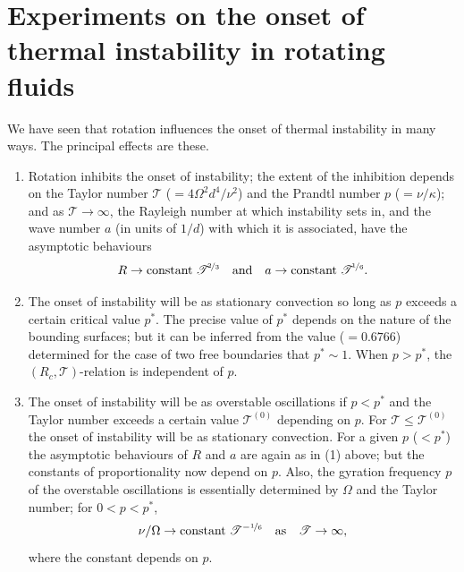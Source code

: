
\section{Experiments on the onset of thermal instability in rotating fluids}
\label{sec:35}

We have seen that rotation influences the onset of thermal instability
in many ways.  The principal effects are these.

\begin{enumerate}
\item[(1)] Rotation inhibits the onset of instability; the extent of the
  inhibition depends on the Taylor number $\mathscr{T}$ ($= 4\Omega^2 d^4/\nu^2$) and the
  Prandtl number $p$ ($= \nu/\kappa$); and as $\mathscr{T} \to \infty$, the Rayleigh number at which
  instability sets in, and the wave number $a$ (in units of $1/d$) with which it
  is associated, have the asymptotic behaviours
  \begin{equation}
    R \to \text{constant}\; \mathscr{T}^{\!\nicefrac{2}{3}}
    \quad \text{and} \quad
    a \to \text{constant}\; \mathscr{T}^{\!\nicefrac{1}{6}}.
    \label{eq:3-308}
  \end{equation}

\item[(2)] The onset of instability will be as stationary convection so long
  as $p$ exceeds a certain critical value $p^*$.  The precise value of $p^*$ depends
  on the nature of the bounding surfaces; but it can be inferred from the
  value ($= 0.6766$) determined for the case of two free boundaries that
  $p^* \sim 1$.  When $p > p^*$, the $(R_c, \mathscr{T})$-relation is independent of $p$.

\item[(3)] The onset of instability will be as overstable oscillations if $p < p^*$
  and the Taylor number exceeds a certain value $\mathscr{T}^{(0)}$ depending on $p$.  For
  $\mathscr{T} \leq \mathscr{T}^{(0)}$ the onset of instability will be as stationary convection.  For a
  given $p$ ($< p^*$) the asymptotic behaviours of $R$ and $a$ are again as in (1)
  above; but the constants of proportionality now depend on $p$.  Also, the
  gyration frequency $p$ of the overstable oscillations is essentially deter\-mined
  by $\Omega$ and the Taylor number; for $0 < p < p^*$,
  \begin{equation}
    \nu/\Omega \to \text{constant}\; \mathscr{T}^{-\nicefrac{1}{6}}
    \quad \text{as} \quad \mathscr{T} \to \infty,
    \label{eq:3-309}
  \end{equation}
  where the constant depends on $p$.
\end{enumerate}

